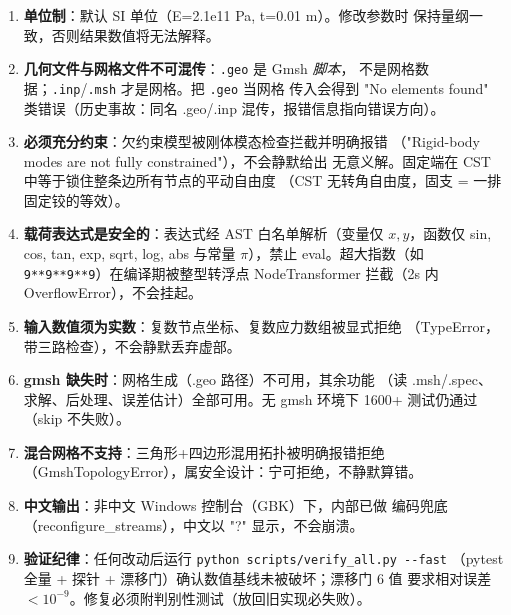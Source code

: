 \documentclass[12pt,a4paper]{ctexart}
\newcommand{\fem}{\Verb}
\begin{document}
\begin{enumerate}[leftmargin=*]
  \item \textbf{单位制}：默认 SI 单位（E=2.1e11 Pa, t=0.01 m）。修改参数时
        保持量纲一致，否则结果数值将无法解释。

  \item \textbf{几何文件与网格文件不可混传}：\fem|.geo| 是 Gmsh \emph{脚本}，
        不是网格数据；\fem|.inp|/\fem|.msh| 才是网格。把 \fem|.geo| 当网格
        传入会得到 "No elements found" 类错误（历史事故：同名 .geo/.inp
        混传，报错信息指向错误方向）。

  \item \textbf{必须充分约束}：欠约束模型被刚体模态检查拦截并明确报错
        （"Rigid-body modes are not fully constrained"），不会静默给出
        无意义解。固定端在 CST 中等于锁住整条边所有节点的平动自由度
        （CST 无转角自由度，固支 = 一排固定铰的等效）。

  \item \textbf{载荷表达式是安全的}：表达式经 AST 白名单解析（变量仅
        $x,y$，函数仅 sin, cos, tan, exp, sqrt, log, abs 与常量 $\pi$），禁止
        eval。超大指数（如 \texttt{9**9**9**9}）在编译期被整型转浮点
        NodeTransformer 拦截（2s 内 OverflowError），不会挂起。

  \item \textbf{输入数值须为实数}：复数节点坐标、复数应力数组被显式拒绝
        （TypeError，带三路检查），不会静默丢弃虚部。

  \item \textbf{gmsh 缺失时}：网格生成（.geo 路径）不可用，其余功能
        （读 .msh/.spec、求解、后处理、误差估计）全部可用。无 gmsh
        环境下 1600+ 测试仍通过（skip 不失败）。

  \item \textbf{混合网格不支持}：三角形+四边形混用拓扑被明确报错拒绝
        （GmshTopologyError），属安全设计：宁可拒绝，不静默算错。

  \item \textbf{中文输出}：非中文 Windows 控制台（GBK）下，内部已做
        编码兜底（reconfigure\_streams），中文以 "?" 显示，不会崩溃。

  \item \textbf{验证纪律}：任何改动后运行 \fem|python scripts/verify_all.py --fast|
        （pytest 全量 + 探针 + 漂移门）确认数值基线未被破坏；漂移门 6 值
        要求相对误差 $<10^{-9}$。修复必须附判别性测试（放回旧实现必失败）。
\end{enumerate}
\end{document}
